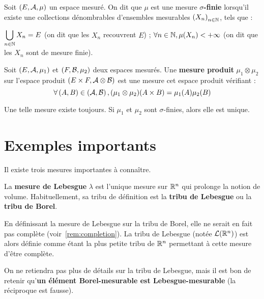 \documentclass[../integ-proba.tex]{subfiles}
\begin{document}
  \begin{defi}
    Soit $\left(E, \mathcal{A}, \mu\right)$ un espace mesuré.
    On dit que $\mu$ est une mesure $\sigma$\textbf{-finie} lorsqu'il existe une collections dénombrables d'ensembles mesurables $\left(X_n\right)_{n \in \mathbb{N}}$, tels que :
    \begin{itemize}
      \itemb $\displaystyle \bigcup_{n \in \mathbb{N}} X_n = E$ (on dit que les $X_n$ recouvrent $E$) ;
      \itemb $\forall n \in \mathbb{N}, \mu(X_n) < + \infty$ (on dit que les $X_n$ sont de mesure finie).
    \end{itemize}
  \end{defi}

  \begin{defi}
    Soit $\left(E, \mathcal{A}, \mu_1\right)$ et $\left(F, \mathcal{B}, \mu_2\right)$ deux espaces mesurés.
    Une \textbf{mesure produit} $\mu_1 \otimes \mu_2$ sur l'espace produit $\left(E \times F, \mathcal{A} \otimes \mathcal{B}\right)$ est une mesure cet espace produit vérifiant :
    \begin{displaymath}
      \forall \left(A, B\right) \in \left(\mathcal{A}, \mathcal{B}\right), (\mu_1 \otimes \mu_2)(A \times B) = \mu_1(A)\mu_2(B)
    \end{displaymath}

    Une telle mesure existe toujours.
    Si $\mu_1$ et $\mu_2$ sont $\sigma$-finies, alors elle est unique.
  \end{defi}


  \section{Exemples importants}
  Il existe trois mesures importantes à connaître.

  \begin{defi}
    La \textbf{mesure de Lebesgue} $\lambda$ est l'unique mesure sur $\mathbb{R}^n$ qui prolonge la notion de volume.
    Habituellement, sa tribu de définition est la \textbf{tribu de Lebesgue} ou la \textbf{tribu de Borel}.
  \end{defi}

  \begin{rem}
    En définissant la mesure de Lebesgue sur la tribu de Borel, elle ne serait en fait pas complète (voir~\ref{rem:completion}).
    La tribu de Lebesgue (notée $\mathcal{L}(\mathbb{R}^n)$) est alors définie comme étant la plus petite tribu de $\mathbb{R}^n$ permettant à cette mesure d'être complète.

    On ne retiendra pas plus de détails sur la tribu de Lebesgue, mais il est bon de retenir qu'\textbf{un élément Borel-mesurable est Lebesgue-mesurable} (la réciproque est fausse).
  \end{rem}
\end{document}
